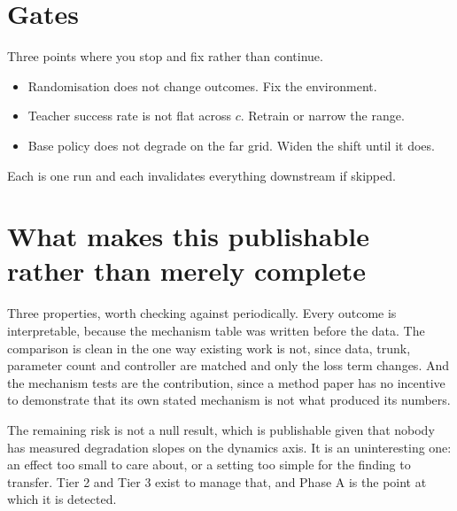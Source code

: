 \documentclass[9pt]{extarticle}
\newcommand{\ck}{\item[$\square$]}
\begin{document}
\section{Gates}

Three points where you stop and fix rather than continue.

\begin{itemize}
\ck Randomisation does not change outcomes. Fix the environment.
\ck Teacher success rate is not flat across $c$. Retrain or narrow the range.
\ck Base policy does not degrade on the far grid. Widen the shift until it does.
\end{itemize}

Each is one run and each invalidates everything downstream if skipped.

\section{What makes this publishable rather than merely complete}

Three properties, worth checking against periodically. Every outcome is interpretable, because the mechanism table was written before the data. The comparison is clean in the one way existing work is not, since data, trunk, parameter count and controller are matched and only the loss term changes. And the mechanism tests are the contribution, since a method paper has no incentive to demonstrate that its own stated mechanism is not what produced its numbers.

The remaining risk is not a null result, which is publishable given that nobody has measured degradation slopes on the dynamics axis. It is an uninteresting one: an effect too small to care about, or a setting too simple for the finding to transfer. Tier 2 and Tier 3 exist to manage that, and Phase A is the point at which it is detected.
\end{document}
